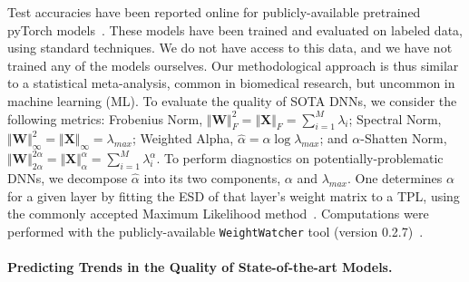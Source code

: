 \documentclass{article}
\begin{document}
Test accuracies have been reported online for publicly-available pretrained pyTorch models~\cite{osmr}.
These models have been trained and evaluated on labeled data, using standard techniques.  
We do not have access to this data, and we have not trained any of the models ourselves. 
Our methodological approach is thus similar to a statistical meta-analysis, common in biomedical research, but uncommon in machine learning (ML).
%
To evaluate the quality of SOTA DNNs, we consider the following metrics:
Frobenius Norm, $\Vert\mathbf{W}\Vert^{2}_{F}=\Vert\mathbf{X}\Vert_{F}=\sum\nolimits_{i=1}^{M} \lambda_{i}$; 
Spectral Norm, $\Vert\mathbf{W}\Vert_{\infty}^{2}=\Vert\mathbf{X}\Vert_{\infty}=\lambda_{max}$;
Weighted Alpha, $\hat{\alpha}=\alpha\log\lambda_{max}$; and
$\alpha$-Shatten Norm, $\Vert\mathbf{W}\Vert^{2\alpha}_{2\alpha}=\Vert\mathbf{X}\Vert^{\alpha}_{\alpha}=\sum\nolimits_{i=1}^{M}\lambda_{i}^{\alpha}$. 
To perform diagnostics on potentially-problematic DNNs, we decompose $\hat{\alpha}$ into its two components, $\alpha$ and $\lambda_{max}$.
One determines $\alpha$ for a given layer by fitting the ESD of that layer's weight matrix to a TPL, using the commonly accepted Maximum Likelihood method~\cite{CSN09_powerlaw,ABP14}.
Computations were performed with the publicly-available \texttt{WeightWatcher} tool (version 0.2.7)~\cite{weightwatcher_package}.


\vspace{-4mm}
\paragraph{Predicting Trends in the Quality of State-of-the-art Models.}
\end{document}
